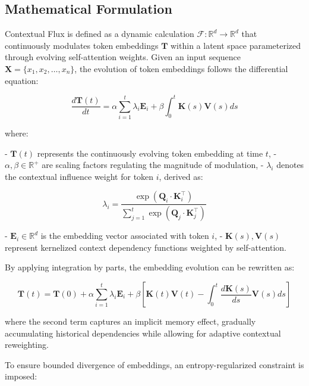 \documentclass{article}
\begin{document}
\subsection{Mathematical Formulation}

Contextual Flux is defined as a dynamic calculation $\mathcal{F}: \mathbb{R}^{d} \to \mathbb{R}^{d}$ that continuously modulates token embeddings $\mathbf{T}$ within a latent space parameterized through evolving self-attention weights. Given an input sequence $\mathbf{X} = \{x_1, x_2, \dots, x_n\}$, the evolution of token embeddings follows the differential equation:

\begin{equation}
	\frac{d\mathbf{T}(t)}{dt} = \alpha \sum_{i=1}^{t} \lambda_i \mathbf{E}_i + \beta \int_{0}^{t} \mathbf{K}(s) \mathbf{V}(s) ds
\end{equation}

where:

- $\mathbf{T}(t)$ represents the continuously evolving token embedding at time $t$,
- $\alpha, \beta \in \mathbb{R}^+$ are scaling factors regulating the magnitude of modulation,
- $\lambda_i$ denotes the contextual influence weight for token $i$, derived as:

\begin{equation}
	\lambda_i = \frac{\exp\left(\mathbf{Q}_i \cdot \mathbf{K}_i^\top \right)}{\sum_{j=1}^{t} \exp\left(\mathbf{Q}_j \cdot \mathbf{K}_j^\top \right)}
\end{equation}

- $\mathbf{E}_i \in \mathbb{R}^{d}$ is the embedding vector associated with token $i$,
- $\mathbf{K}(s), \mathbf{V}(s)$ represent kernelized context dependency functions weighted by self-attention.

By applying integration by parts, the embedding evolution can be rewritten as:

\begin{equation}
	\mathbf{T}(t) = \mathbf{T}(0) + \alpha \sum_{i=1}^{t} \lambda_i \mathbf{E}_i + \beta \left[ \mathbf{K}(t) \mathbf{V}(t) - \int_{0}^{t} \frac{d\mathbf{K}(s)}{ds} \mathbf{V}(s) ds \right]
\end{equation}

where the second term captures an implicit memory effect, gradually accumulating historical dependencies while allowing for adaptive contextual reweighting.

To ensure bounded divergence of embeddings, an entropy-regularized constraint is imposed:
\end{document}
